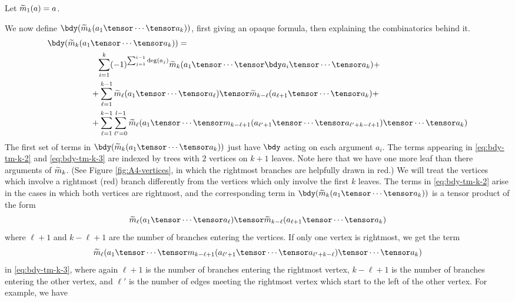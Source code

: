 \documentclass[11pt,leqno]{amsart}
\begin{document}
Let $\widetilde{m}_1(a) = a$.

We now define $\bdy(\tm_k(a_1 \tensor \cdots \tensor a_k))$, first giving an opaque formula, then explaining the combinatorics behind it.
\begin{align}
\notag \bdy(\tm_k(a_1 & \tensor \cdots \tensor a_k)) = \\
\label{eq:bdy-tm-k-1}   & \phantom{+} \sum_{i=1}^k (-1)^{\sum_{j=1}^{i-1} \deg(a_j)} \tm_k(a_1 \tensor \cdots \tensor \bdy a_i \tensor \cdots \tensor a_k) + \\
\label{eq:bdy-tm-k-2}   &          +  \sum_{\ell=1}^{k-1} \tm_{\ell}(a_1 \tensor \cdots \tensor a_{\ell}) \tensor \tm_{k-\ell}(a_{\ell+1} \tensor \cdots \tensor a_k) + \\
\label{eq:bdy-tm-k-3}   &          +  \sum_{\ell=1}^{k-1} \sum_{\ell'=0}^{l-1} \tm_{\ell}(a_1 \tensor \cdots \tensor m_{k-\ell + 1}(a_{\ell' + 1} \tensor \cdots \tensor a_{\ell' + k - \ell + 1}) \tensor \cdots \tensor a_k)
\end{align}
The first set of terms in $\bdy(\tm_k(a_1 \tensor \cdots \tensor a_k))$ just have $\bdy$ acting on each argument $a_i$.
The terms appearing in \eqref{eq:bdy-tm-k-2} and \eqref{eq:bdy-tm-k-3} are indexed by trees with $2$ vertices on $k+1$ leaves.
Note here that we have one more leaf than there arguments of $\widetilde{m}_k$.
(See Figure \ref{fig:A4-vertices}, in which the rightmost branches are helpfully drawn in red.)
We will treat the vertices which involve a rightmost (red) branch differently from the vertices which only involve the first $k$ leaves.
The terms in \eqref{eq:bdy-tm-k-2} arise in the cases in which both
vertices are rightmost, and the corresponding term in $\bdy(\tm_k(a_1 \tensor \cdots \tensor a_k))$ is a tensor product of the form
$$\tm_{\ell}(a_1 \tensor \cdots \tensor a_{\ell}) \tensor \tm_{k-\ell}(a_{\ell+1} \tensor \cdots \tensor a_k)$$
where $\ell + 1$ and $k - \ell + 1$ are the number of branches entering the vertices.
If only one vertex is rightmost, we get the term $$\tm_{\ell}(a_1 \tensor \cdots \tensor m_{k-\ell+1}(a_{\ell' + 1} \tensor \cdots \tensor a_{\ell' + k - \ell}) \tensor \cdots \tensor a_k)$$
in \eqref{eq:bdy-tm-k-3},
where again $\ell + 1$ is the number of branches entering the rightmost vertex, $k-\ell+1$ is the number of branches entering the other vertex, and $\ell'$ is the number of edges meeting the rightmost vertex which start to the left of the other vertex.
For example, we have
\end{document}
